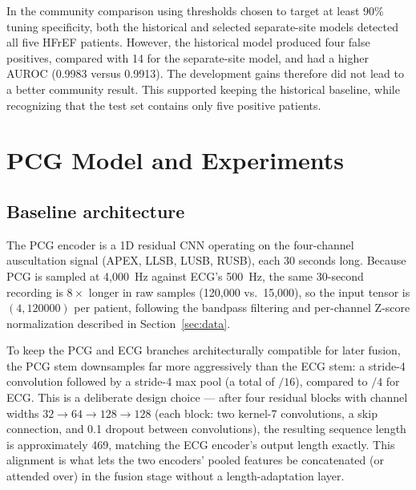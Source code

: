 \documentclass[11pt,a4paper]{article}
\newcommand{\draftnote}[1]{\par\smallskip\noindent\textcolor{blue}{\textbf{To write:} #1}\par\smallskip}
\begin{document}
In the community comparison using thresholds chosen to target at least
90\% tuning specificity, both the historical and selected separate-site
models detected all five HFrEF patients. However, the historical model
produced four false positives, compared with 14 for the separate-site
model, and had a higher AUROC (0.9983 versus 0.9913). The development gains
therefore did not lead to a better community result. This supported keeping
the historical baseline, while recognizing that the test set contains
only five positive patients.


\section{PCG Model and Experiments}
\label{sec:pcg}

\subsection{Baseline architecture}
The PCG encoder is a 1D residual CNN operating on the four-channel auscultation
signal (APEX, LLSB, LUSB, RUSB), each 30 seconds long. Because PCG is sampled
at 4{,}000~Hz against ECG's 500~Hz, the same 30-second recording is $8\times$
longer in raw samples (120{,}000 vs.\ 15{,}000), so the input tensor is
$(4, 120000)$ per patient, following the bandpass filtering and per-channel
Z-score normalization described in Section~\ref{sec:data}.

To keep the PCG and ECG branches architecturally compatible for later fusion,
the PCG stem downsamples far more aggressively than the ECG stem: a stride-4
convolution followed by a stride-4 max pool (a total of $/16$), compared to
$/4$ for ECG. This is a deliberate design choice --- after four residual
blocks with channel widths $32{\to}64{\to}128{\to}128$ (each block: two
kernel-7 convolutions, a skip connection, and 0.1 dropout between
convolutions), the resulting sequence length is approximately 469, matching
the ECG encoder's output length exactly. This alignment is what lets the two
encoders' pooled features be concatenated (or attended over) in the fusion
stage without a length-adaptation layer.
\end{document}
